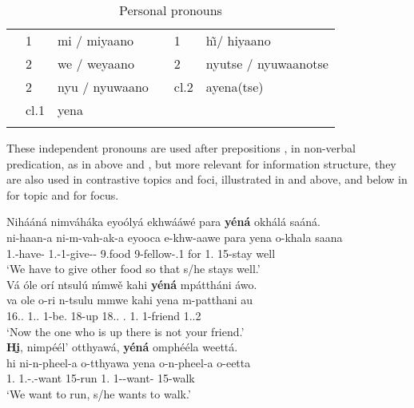\documentclass[output=paper]{langscibook}
\begin{document}
\begin{table}
\begin{tabularx}{\textwidth}{llQ lll}
\lsptoprule
\SG{}   &  1 &  mi / miyaano             & \PL{}   & 1 & h\~\i / hiyaano\\
        & 2 & we / weyaano               &         & 2 & nyutse / nyuwaanotse\\
        & 2\RESP{} &  nyu / nyuwaano     &         & cl.2 & ayena(tse)\\
        & cl.1 & yena\\
\lspbottomrule
\end{tabularx}
\caption{\label{pronouns}Personal pronouns \citep[64]{vanderWal2009a}}
\end{table}

These independent pronouns are used after prepositions , in non-verbal predication, as in  above and , but more relevant for information structure, they are also used in contrastive topics and foci, illustrated in  and  above, and below in  for topic and  for focus.\largerpage

\ea
\label{bkm:Ref110500800}
Nihááná nimváháka eyoólyá ekhwááwé para \textbf{yéná} okhálá saáná.\\
\gll
ni-haan-a  ni-m-vah-ak-a  eyooca  e-khw-aawe para  yena  o-khala  saana \\
1\PL{}.\SM{}-have-\FV{}  1\PL{}.\SM{}-1\OM{}-give-\DUR{}-\FV{}  9.food  9-fellow-\POSS{}.1  for  1.\PRO{}  15-stay  well  \\
\glt
‘We have to give other food so that s/he stays well.’\\


\ex
\label{bkm:Ref110500835}
Vá óle orí ntsulú ḿmwě kahi \textbf{yéná} mpáttháni áwo.\\
\gll
va  ole  o-ri  n-tsulu  mmwe kahi  yena  m-patthani  au \\
16.\DEM{}.\PROX{}  1.\DEM{}.\DIST{}  1\SM{}-be.\REL{}  18-up  18.\DEM{}.\DIST{}  \NEG{}.\COP{}  1.\PRO{}  1-friend  1.\POSS{}.2\SG{} \\
\glt
‘Now the one who is up there is not your friend.’\\

\ex
\label{bkm:Ref129273753}
\textbf{Hḭ}, nimpéél’ otthyawá, \textbf{yéná} omphééla weettá.\\
\gll
hi  ni-n-pheel-a  o-tthyawa  yena  o-n-pheel-a  o-eetta\\
1\PL{}.\PRO{}  1\PL{}.\SM{}-\PRS{}.\CJ{}-want   15-run  1.\PRO{}  1\SM{}-\PRS{}-want-\FV{}  15-walk\\
\glt
‘We want to run, s/he wants to walk.’\\
\end{document}
